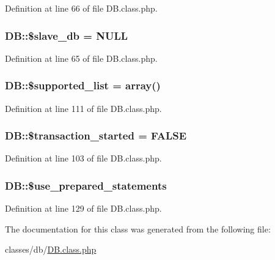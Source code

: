 Definition at line 66 of file D\+B.\+class.\+php.

\subsubsection[{\texorpdfstring{\$slave\+\_\+db}{$slave_db}}]{\setlength{\rightskip}{0pt plus 5cm}D\+B\+::\$slave\+\_\+db = N\+U\+LL}\hypertarget{classDB_a0a811a4446882ee9edf0ed846e8926f3}{}\label{classDB_a0a811a4446882ee9edf0ed846e8926f3}


Definition at line 65 of file D\+B.\+class.\+php.

\subsubsection[{\texorpdfstring{\$supported\+\_\+list}{$supported_list}}]{\setlength{\rightskip}{0pt plus 5cm}D\+B\+::\$supported\+\_\+list = array()}\hypertarget{classDB_ac09dd547a22963632e063c9ab68b7707}{}\label{classDB_ac09dd547a22963632e063c9ab68b7707}


Definition at line 111 of file D\+B.\+class.\+php.

\subsubsection[{\texorpdfstring{\$transaction\+\_\+started}{$transaction_started}}]{\setlength{\rightskip}{0pt plus 5cm}D\+B\+::\$transaction\+\_\+started = F\+A\+L\+SE}\hypertarget{classDB_a39a0eef56f82082ca4c69bcad1f12a31}{}\label{classDB_a39a0eef56f82082ca4c69bcad1f12a31}


Definition at line 103 of file D\+B.\+class.\+php.

\subsubsection[{\texorpdfstring{\$use\+\_\+prepared\+\_\+statements}{$use_prepared_statements}}]{\setlength{\rightskip}{0pt plus 5cm}D\+B\+::\$use\+\_\+prepared\+\_\+statements}\hypertarget{classDB_a9902aee7d8900a597670fce92c7eb74b}{}\label{classDB_a9902aee7d8900a597670fce92c7eb74b}


Definition at line 129 of file D\+B.\+class.\+php.



The documentation for this class was generated from the following file\+:\begin{DoxyCompactItemize}
\item 
classes/db/\hyperlink{DB_8class_8php}{D\+B.\+class.\+php}\end{DoxyCompactItemize}
